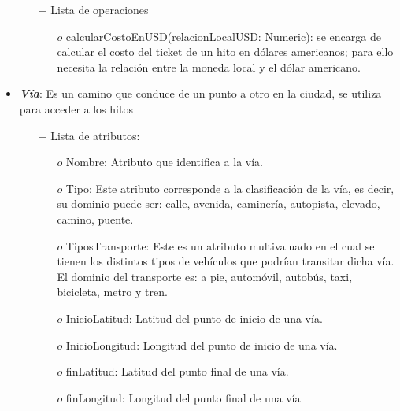 \documentclass[a4paper]{article}
\begin{document}
\begin{itemize}
{\begin{itemize}
\begin{itemize}
	\end{itemize}


	\item[$-$] Lista de operaciones

	\begin{itemize}
		\item[$o$] calcularCostoEnUSD(relacionLocalUSD: Numeric): se encarga de calcular el costo del ticket de un hito en dólares americanos; para ello necesita la relación entre la moneda local y el dólar americano.
	
	\end{itemize}



    \end{itemize}

}


\item{
	\textbf{\textit{Vía}}: Es un camino que conduce de un punto a otro en la ciudad, se utiliza para acceder a los hitos 
  		
     \begin{itemize}   
  		\item[$-$] Lista de atributos:

	\begin{itemize}

        \item[$o$] Nombre: Atributo que identifica a la vía.
\item[$o$] Tipo: Este atributo corresponde a la clasificación de la vía, es decir, su dominio puede ser: calle, avenida, caminería, autopista, elevado, camino, puente.
\item[$o$] TiposTransporte:   Este es un atributo multivaluado en el cual se tienen los distintos tipos de vehículos que podrían transitar dicha vía. El dominio del transporte es: a pie, automóvil, autobús, taxi, bicicleta, metro y tren. 
\item[$o$] InicioLatitud: Latitud del punto de inicio de una vía.
\item[$o$] InicioLongitud: Longitud del punto de inicio de una vía.
\item[$o$] finLatitud: Latitud del punto final de una vía.
\item[$o$] finLongitud: Longitud del punto final de una vía


	\end{itemize}


    \end{itemize}

}



\end{itemize}
\end{document}
